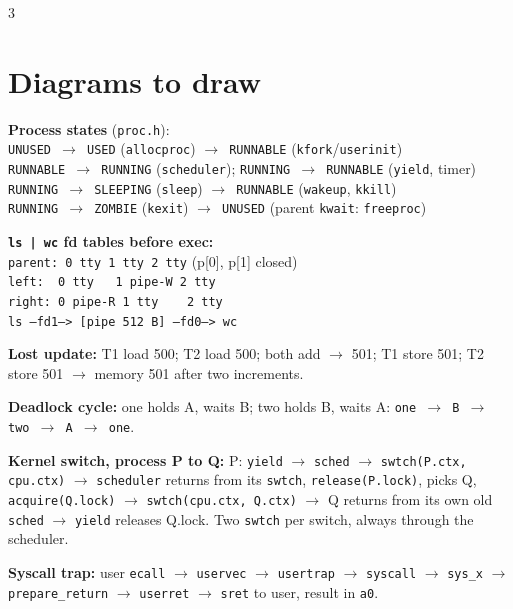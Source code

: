 \documentclass[9pt]{extarticle}
\newcommand{\cc}[1]{\texttt{#1}}
\newcommand{\ra}{$\rightarrow$}
\begin{document}
\begin{multicols*}{3}
\section{Diagrams to draw}
\textbf{Process states} (\cc{proc.h}):\\
\cc{UNUSED \ra{} USED} (\cc{allocproc}) \cc{\ra{} RUNNABLE} (\cc{kfork}/\cc{userinit})\\
\cc{RUNNABLE \ra{} RUNNING} (\cc{scheduler}); \cc{RUNNING \ra{} RUNNABLE} (\cc{yield}, timer)\\
\cc{RUNNING \ra{} SLEEPING} (\cc{sleep}) \cc{\ra{} RUNNABLE} (\cc{wakeup}, \cc{kkill})\\
\cc{RUNNING \ra{} ZOMBIE} (\cc{kexit}) \cc{\ra{} UNUSED} (parent \cc{kwait}: \cc{freeproc})

\textbf{\cc{ls | wc} fd tables before exec:}\\
\cc{parent: 0 tty 1 tty 2 tty} (p[0], p[1] closed)\\
\cc{left:\ \ 0 tty \ \ 1 pipe-W 2 tty}\\
\cc{right: 0 pipe-R 1 tty\ \ \ \ 2 tty}\\
\cc{ls --fd1--> [pipe 512 B] --fd0--> wc}

\textbf{Lost update:} T1 load 500; T2 load 500; both add \ra{} 501; T1 store 501; T2 store 501 \ra{} memory 501 after two increments.

\textbf{Deadlock cycle:} one holds A, waits B; two holds B, waits A: \cc{one \ra{} B \ra{} two \ra{} A \ra{} one}.

\textbf{Kernel switch, process P to Q:} P: \cc{yield} \ra{} \cc{sched} \ra{} \cc{swtch(P.ctx, cpu.ctx)} \ra{} \cc{scheduler} returns from its \cc{swtch}, \cc{release(P.lock)}, picks Q, \cc{acquire(Q.lock)} \ra{} \cc{swtch(cpu.ctx, Q.ctx)} \ra{} Q returns from its own old \cc{sched} \ra{} \cc{yield} releases Q.lock. Two \cc{swtch} per switch, always through the scheduler.

\textbf{Syscall trap:} user \cc{ecall} \ra{} \cc{uservec} \ra{} \cc{usertrap} \ra{} \cc{syscall} \ra{} \cc{sys\_x} \ra{} \cc{prepare\_return} \ra{} \cc{userret} \ra{} \cc{sret} to user, result in \cc{a0}.


\end{multicols*}
\end{document}
